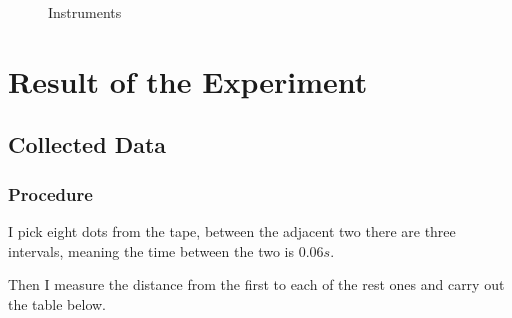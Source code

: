 \documentclass[12pt,a4paper]{article}
\begin{document}
\begin{figure}[H]
    \caption{Instruments}
    \end{figure}
\section{Result of the Experiment}
\subsection{Collected Data}
\subsubsection{Procedure}
I pick eight dots from the tape, between the adjacent two there are three intervals,
meaning the time between the two is $0.06s$.\par
Then I measure the distance from the first to each of the rest ones and carry out the 
table below.
\end{document}
